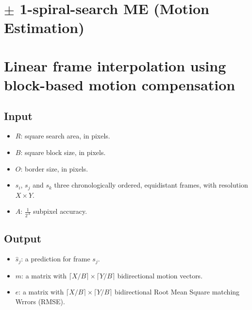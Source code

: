 
\section{$\pm$ 1-spiral-search ME (Motion Estimation)}

\section{Linear frame interpolation using block-based motion compensation}
\label{sec:linear_frame_interpolation}

\subsection{Input}
\begin{itemize}
\tightlist
\item
  \(R\): square search area, in pixels.
\item
  \(B\): square block size, in pixels.
\item
  \(O\): border size, in pixels.
\item
  \(s_i\), \(s_j\) and \(s_k\) three chronologically ordered,
  equidistant frames, with resolution \(X\times Y\).
\item
  \(A\): \(\frac{1}{2^A}\) subpixel accuracy.
\end{itemize}

\subsection{Output}
\begin{itemize}
\tightlist
\item
  \(\hat{s}_j\): a prediction for frame \(s_j\).
\item
  \(m\): a matrix with \(\lceil X/B\rceil \times \lceil Y/B\rceil\)
  bidirectional motion vectors.
\item
  \(e\): a matrix with \(\lceil X/B\rceil \times \lceil Y/B\rceil\)
  bidirectional Root Mean Square matching Wrrors (RMSE).
\end{itemize}


